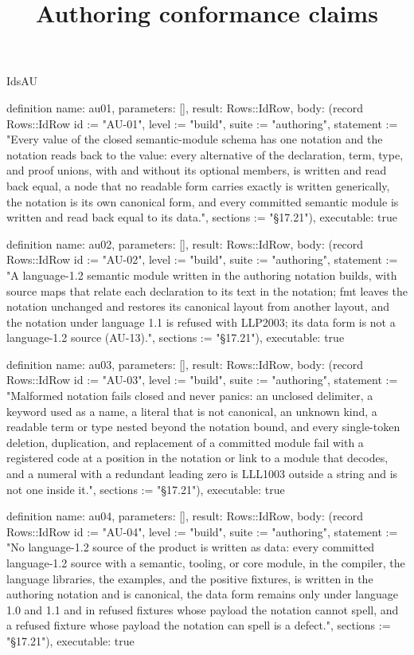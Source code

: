 \begin{lexlean}{IdsAU}
\title{Authoring conformance claims}
\begin{semanticmodule}
definition{
  name: au01,
  parameters: [],
  result: Rows::IdRow,
  body: (record Rows::IdRow {id := "AU-01", level := "build", suite := "authoring", statement := "Every value of the closed semantic-module schema has one notation and the notation reads back to the value: every alternative of the declaration, term, type, and proof unions, with and without its optional members, is written and read back equal, a node that no readable form carries exactly is written generically, the notation is its own canonical form, and every committed semantic module is written and read back equal to its data.", sections := "§17.21"}),
  executable: true
}

definition{
  name: au02,
  parameters: [],
  result: Rows::IdRow,
  body: (record Rows::IdRow {id := "AU-02", level := "build", suite := "authoring", statement := "A language-1.2 semantic module written in the authoring notation builds, with source maps that relate each declaration to its text in the notation; fmt leaves the notation unchanged and restores its canonical layout from another layout, and the notation under language 1.1 is refused with LLP2003; its data form is not a language-1.2 source (AU-13).", sections := "§17.21"}),
  executable: true
}

definition{
  name: au03,
  parameters: [],
  result: Rows::IdRow,
  body: (record Rows::IdRow {id := "AU-03", level := "build", suite := "authoring", statement := "Malformed notation fails closed and never panics: an unclosed delimiter, a keyword used as a name, a literal that is not canonical, an unknown kind, a readable term or type nested beyond the notation bound, and every single-token deletion, duplication, and replacement of a committed module fail with a registered code at a position in the notation or link to a module that decodes, and a numeral with a redundant leading zero is LLL1003 outside a string and is not one inside it.", sections := "§17.21"}),
  executable: true
}

definition{
  name: au04,
  parameters: [],
  result: Rows::IdRow,
  body: (record Rows::IdRow {id := "AU-04", level := "build", suite := "authoring", statement := "No language-1.2 source of the product is written as data: every committed language-1.2 source with a semantic, tooling, or core module, in the compiler, the language libraries, the examples, and the positive fixtures, is written in the authoring notation and is canonical, the data form remains only under language 1.0 and 1.1 and in refused fixtures whose payload the notation cannot spell, and a refused fixture whose payload the notation can spell is a defect.", sections := "§17.21"}),
  executable: true
}


\end{semanticmodule}
\end{lexlean}
